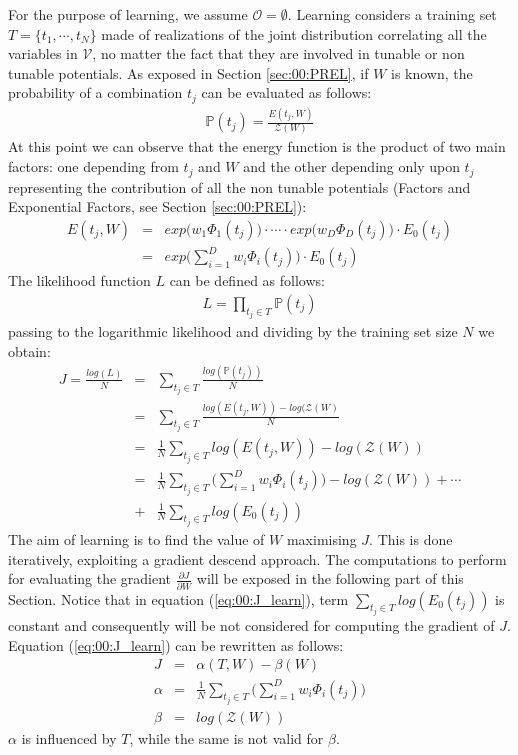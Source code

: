 For the purpose of learning, we assume $\mathcal{O} = \emptyset$. Learning considers a training set $T = \lbrace t_1, \cdots ,t_N \rbrace$ made of realizations of the joint distribution correlating all the variables in $\mathcal{V}$, no matter the fact that they are involved in tunable or non tunable potentials.
As exposed in Section \ref{sec:00:PREL}, if $W$ is known, the probability of a combination $t_j$ can be evaluated as follows:
\begin{eqnarray}
\mathbb{P}(t_j) = \frac{E(t_j, W)}{\mathcal{Z}(W)}
\end{eqnarray}
At this point we can observe that the energy function is the product of two main factors: one depending from $t_j$ and $W$  and the other depending only upon $t_j$ representing the contribution of all the non tunable potentials (Factors and Exponential Factors, see Section \ref{sec:00:PREL}):
\begin{eqnarray}
E(t_j, W) &=&  exp \big( w_1 \Phi _1(t_j) \big) \cdot \cdots \cdot exp \big( w_D \Phi _D(t_j) \big) \cdot E_0(t_j) \nonumber\\
		  &=& exp \big( \sum _{i=1} ^{D} w_i \Phi _i(t_j) \big) \cdot E_0(t_j)
\end{eqnarray}
The likelihood function $L$ can be defined as follows:
\begin{eqnarray}
L = \prod _{t_j \in T} \mathbb{P}(t_j) 
\end{eqnarray}
passing to the logarithmic likelihood and dividing by the training set size $N$ we obtain:
\begin{eqnarray}
J = \frac{log(L)}{N} &=& \sum _{t_j \in T} \frac{log(\mathbb{P}(t_j))}{N} \nonumber\\
   					 &=& \sum _{t_j \in T} \frac{ log(E(t_j, W)) - log(\mathcal{Z}(W) }{N} \nonumber\\
   					 &=& \frac{1}{N} \sum _{t_j \in T}  log(E(t_j, W)) - log(\mathcal{Z}(W)) \nonumber\\
   					 &=& \frac{1}{N} \sum _{t_j \in T}  \big( \sum _{i=1} ^{D} w_i \Phi _i(t_j) \big)
   					     -log(\mathcal{Z}(W)) + \cdots \nonumber\\
   					 	 &+& \frac{1}{N} \sum _{t_j \in T}  log(E_0 (t_j))
   					 	 \label{eq:00:J_learn}
\end{eqnarray}
The aim of learning is to find the value of $W$ maximising $J$. This is done iteratively, exploiting a gradient descend approach. The computations to perform for evaluating the gradient $\frac{\partial J}{\partial W}$ will be exposed in the following part of this Section.
Notice that in equation (\ref{eq:00:J_learn}), term $\sum _{t_j \in T}  log(E_0 (t_j))$ is constant and consequently will be not considered for computing the gradient of $J$. Equation (\ref{eq:00:J_learn}) can be rewritten as follows:
\begin{eqnarray}
J &=& \alpha (T, W) - \beta (W) \nonumber\\
\alpha &=& \frac{1}{N} \sum _{t_j \in T}  \big( \sum _{i=1} ^{D} w_i \Phi _i(t_j) \big) \label{eq:00:J_learn_alfa} \\
\beta &=& log(\mathcal{Z}(W)) \label{eq:00:J_learn_beta}
\end{eqnarray}
$\alpha$ is influenced by $T$, while the same is not valid for $\beta$. 

